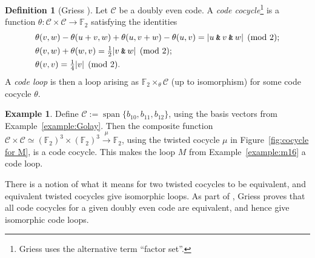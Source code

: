 \documentclass{article}
\theoremstyle{plain}
\theoremstyle{definition}
\newtheorem*{definition}{Definition}
\newtheorem{example}{Example}
\def \cC {\mathcal{C}}
\def \FF {\mathbb{F}}
\newcommand{\AND}{\mathbin{\textup{\texttt{\&}}}}
\DeclareMathOperator{\Span}{span}
\begin{document}
\begin{definition}[Griess \cite{Griess}]
Let $\cC$ be a doubly even code. 
A \emph{code cocycle}\footnote{Griess uses the alternative term ``factor set''.} is a function $\theta\colon \cC \times \cC \to \FF_2$ satisfying the identities
\begin{align}
& \theta(v,w)-\theta(u+v,w)+\theta(u,v+w)-\theta(u,v) =|u\AND v \AND w| \pmod 2; \label{eq: code cocycle 1}\\
& \theta(v,w)+\theta(w,v) = {}  \tfrac12|v\AND w| \pmod 2; \label{eq: code cocycle 2}\\
& \theta(v,v) = {}  \tfrac14|v| \pmod 2.\label{eq: code cocycle 3}
\end{align}
A \emph{code loop} is then a loop arising as $\FF_2\times_\theta \cC$ (up to isomorphism) for some code cocycle $\theta$.
\end{definition}


\begin{example}
Define $\cC := \Span\{b_{10},b_{11},b_{12}\}$, using the basis vectors from Example~\ref{example:Golay}. Then the composite function $\cC\times \cC \simeq (\FF_2)^3\times (\FF_2)^3 \xrightarrow{\mu} \FF_2$, using the twisted cocycle $\mu$ in Figure~\ref{fig:cocycle for M}, is a code cocycle. This makes the loop $M$ from Example~\ref{example:m16} a code loop.
\end{example}

There is a notion of what it means for two twisted cocycles to be equivalent, and equivalent twisted cocycles give isomorphic loops.
As part of \cite[Theorem 10]{Griess}, Griess proves that all code cocycles for a given doubly even code are equivalent, and hence give isomorphic code loops. 

\end{document}
